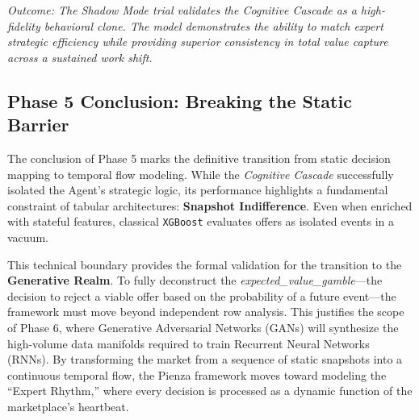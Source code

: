 \noindent \textit{Outcome: The Shadow Mode trial validates the Cognitive Cascade as a high-fidelity behavioral clone. The model demonstrates the ability to match expert strategic efficiency while providing superior consistency in total value capture across a sustained work shift.}

\subsection{Phase 5 Conclusion: Breaking the Static Barrier}
The conclusion of Phase 5 marks the definitive transition from static decision mapping to temporal flow modeling. While the \textit{Cognitive Cascade} successfully isolated the Agent's strategic logic, its performance highlights a fundamental constraint of tabular architectures: \textbf{Snapshot Indifference}. Even when enriched with stateful features, classical \texttt{XGBoost} evaluates offers as isolated events in a vacuum. 

This technical boundary provides the formal validation for the transition to the \textbf{Generative Realm}. To fully deconstruct the \textit{expected\_value\_gamble}---the decision to reject a viable offer based on the probability of a future event---the framework must move beyond independent row analysis. This justifies the scope of Phase 6, where Generative Adversarial Networks (GANs) will synthesize the high-volume data manifolds required to train Recurrent Neural Networks (RNNs). By transforming the market from a sequence of static snapshots into a continuous temporal flow, the Pienza framework moves toward modeling the ``Expert Rhythm,'' where every decision is processed as a dynamic function of the marketplace's heartbeat.




